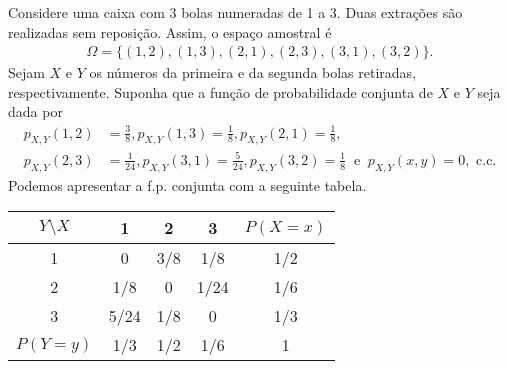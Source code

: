 \documentclass[../Notas.tex]{subfiles}
\begin{document}
\begin{example}
Considere uma caixa com 3 bolas numeradas de 1 a 3. Duas extrações são realizadas sem reposição. Assim, o espaço amostral é
\begin{align*}
    \Omega = \{ (1,2), (1,3), (2,1), (2,3), (3,1), (3,2) \}.
\end{align*}
Sejam $X$ e $Y$ os números da primeira e da segunda bolas retiradas, respectivamente. Suponha que a função de probabilidade conjunta de $X$ e $Y$ seja dada por
\begin{align*}
    p_{X, Y}(1,2) &= \frac{3}{8}, p_{X, Y}(1,3) = \frac{1}{8}, p_{X, Y}(2,1) = \frac{1}{8}, \\
    p_{X, Y}(2,3) &= \frac{1}{24}, p_{X, Y}(3,1) = \frac{5}{24}, p_{X, Y}(3,2) = \frac{1}{8} \ \text{ e } \ p_{X, Y}(x,y) = 0, \text{ c.c.}
\end{align*}
Podemos apresentar a f.p. conjunta com a seguinte tabela.
\begin{table}[H]
    \centering
    \begin{tabular}{c|c|c|c|c}
    $Y\setminus X$ & 1 & 2 & 3 & $P(X=x)$ \\
    \hline
    1 & 0 & 3/8 & 1/8 & 1/2 \\
    \hline
    2 & 1/8 & 0 & 1/24 & 1/6 \\
    \hline
    3 & 5/24 & 1/8 & 0 & 1/3 \\
    \hline
    $P(Y=y)$ & 1/3 & 1/2 & 1/6 & 1 \\
\end{tabular}
\end{table}
\end{example}
\end{document}
